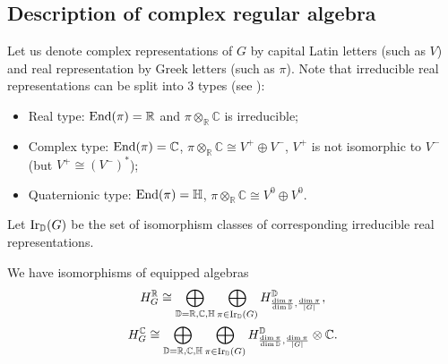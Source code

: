 \documentclass[pdftex]{sigma}
\def \R {{\mathbb R}}
\def \C {{\mathbb C}}
\def \H {{\mathbb H}}
\def \ens {{\rm End}}
\begin{document}
\subsection{Description of complex regular algebra}

Let us denote complex representations of $G$ by capital Latin letters (such as
$V$) and real representation by Greek letters (such as $\pi$).
Note that irreducible real representations can be split into 3 types
 (see \cite{FH}):
\begin{itemize}\itemsep=0pt
\item Real type:  $\ens (\pi) = \R$ and $\pi \otimes_\R \C$ is irreducible;
\item Complex type: $\ens (\pi) = \C$, $\pi \otimes_\R \C \cong V^+ \oplus V^-$, $V^+$ is not isomorphic to  $V^-$ (but  $V^+ \cong
\left( V^-\right)^*$);
\item Quaternionic  type: $\ens (\pi) = \H$, $\pi \otimes_\R \C \cong V^0 \oplus V^0$.
\end{itemize}

Let ${\rm Ir}_\mathbb{D}(G)$ be the set of isomorphism classes of corresponding
irreducible real representations.
\begin{theorem}\label{dec}
We have isomorphisms of equipped algebras
\begin{gather}\label{eqr}
H_G^\mathbb{R} \cong \bigoplus_{\mathbb{D}=\mathbb{R},\mathbb{C},\mathbb{H}}
\bigoplus_{\pi\in {\rm Ir}_\mathbb{D}(G)}
H^\mathbb{D}_{\frac{\dim\pi}{\dim {\mathbb D}},\frac{\dim\pi}{|G|}},
\\
\label{eqcc}
H_G^\mathbb{C} \cong \bigoplus_{\mathbb{D}=\mathbb{R},\mathbb{C},\mathbb{H}}
\bigoplus_{\pi\in {\rm Ir}_\mathbb{D}(G)}
H^\mathbb{D}_{\frac{\dim\pi}{\dim {\mathbb D}},\frac{\dim\pi}{|G|}} \otimes \mathbb{C}.
\end{gather}
\end{theorem}
\end{document}
